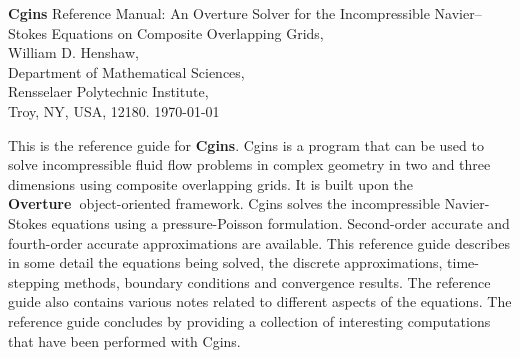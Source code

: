 \documentclass[10pt]{article}
\newcommand{\Overture}{{\bf Over\-ture\ }}
\begin{document}
\vspace{5\baselineskip}
\begin{flushleft}
{\Large
{\bf Cgins} Reference Manual: An Overture Solver for the Incompressible Navier--Stokes Equations on Composite Overlapping Grids, \\
}
\vspace{2\baselineskip}
William D. Henshaw,\\
Department of Mathematical Sciences, \\
Rensselaer Polytechnic Institute, \\
Troy, NY, USA, 12180.
\vspace{\baselineskip}
\today\\

\vspace{4\baselineskip}


This is the reference guide for {\bf Cgins}.  Cgins is a program that can be
used to solve incompressible fluid flow problems in complex geometry in two and
three dimensions using composite overlapping grids. It is built upon the
\Overture object-oriented framework.  Cgins solves the incompressible
Navier-Stokes equations using a pressure-Poisson formulation. Second-order
accurate and fourth-order accurate approximations are available.
This reference guide describes in some detail the equations being solved,
the discrete approximations, time-stepping methods, boundary conditions and convergence results. 
The reference guide also contains various notes related to different aspects of the equations. 
The reference guide concludes by providing a collection of interesting computations that
have been performed with Cgins. 




\end{flushleft}
\end{document}

